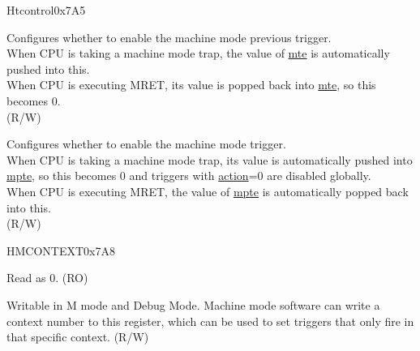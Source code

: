 \begin{register}{H}{tcontrol}{0x7A5}\label{regdesc:TCONTROL}
%
%
%
%
\regnewline%
\begin{regdesc}\begin{reglist}
\label{fielddesc:TCONTROLMPTE}\item [mpte] Configures whether to enable the machine mode previous trigger.\\
When CPU is taking a machine mode trap, the value of \hyperref[fielddesc:TCONTROLMTE]{mte} is automatically pushed into this.\\
When CPU is executing MRET, its value is popped back into \hyperref[fielddesc:TCONTROLMTE]{mte}, so this becomes 0.\\
(R/W)
\label{fielddesc:TCONTROLMTE}\item [mte] Configures whether to enable the machine mode trigger.\\
When CPU is taking a machine mode trap, its value is automatically pushed into \hyperref[fielddesc:TCONTROLMPTE]{mpte}, so this becomes 0 and triggers with \hyperref[fielddesc:MCONTROLACTION]{action}=0 are disabled globally.\\
When CPU is executing MRET, the value of \hyperref[fielddesc:TCONTROLMPTE]{mpte} is automatically popped back into this.\\
(R/W)
\end{reglist}\end{regdesc}
\end{register}

\begin{register}{H}{MCONTEXT}{0x7A8}\label{regdesc:MCONTEXT}
%
%
\regnewline%
\begin{regdesc}\begin{reglist}
\label{fielddesc:monctext_rsvd}\item [Reserved] Read as 0. (RO)
\label{fielddesc:CONTEXT}\item [context] Writable in M mode and Debug Mode. Machine mode software can write a context number to this register, which can be used to set triggers that only fire in that specific context. (R/W)
\end{reglist}\end{regdesc}
\end{register}


